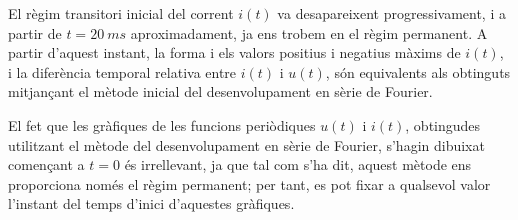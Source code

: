 \begin{exemple}
    El règim transitori inicial del corrent $i(t)$ va desapareixent progressivament, i a partir de $t=\qty{20}{ms}$ aproximadament, ja ens trobem en el règim permanent.
    A partir d'aquest instant, la forma i els valors positius i negatius màxims de $i(t)$, i la diferència temporal relativa entre $i(t)$ i $u(t)$, són equivalents als obtinguts mitjançant el mètode inicial del desenvolupament en sèrie de Fourier.

    El fet que les gràfiques de les funcions periòdiques $u(t)$ i  $i(t)$, obtingudes utilitzant el mètode del desenvolupament en sèrie de Fourier, s'hagin dibuixat començant a $t=0$ és irrellevant, ja que tal com s'ha dit,   aquest mètode ens proporciona només el règim permanent; per tant, es pot fixar a qualsevol valor l'instant del temps d'inici d'aquestes gràfiques.
\end{exemple}
